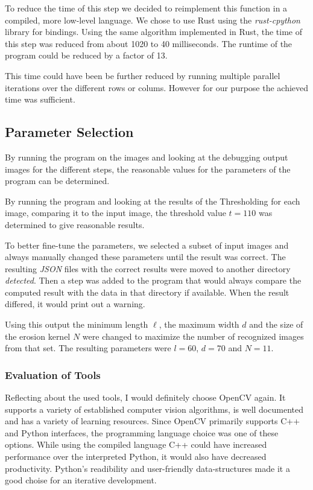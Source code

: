 \documentclass[serif,article,noparskip]{agse-thesis}
\begin{document}
To reduce the time of this step we decided to reimplement this function in a
compiled, more low-level language. We chose to use Rust using the \textit{rust-cpython}
library for bindings. Using the same algorithm implemented in Rust, the time of
this step was reduced from about 1020 to 40 milliseconds. The runtime of the
program could be reduced by a factor of 13.

This time could have been be further reduced by running multiple parallel
iterations over the different rows or colums. However for our purpose the
achieved time was sufficient.


\subsection{Parameter Selection} \label{parameter}

By running the program on the images and looking at the debugging output images
for the different steps, the reasonable values for the parameters of the program
can be determined.

By running the program and looking at the results of the Thresholding for each
image, comparing it to the input image, the threshold value $t = 110$ was
determined to give reasonable results.

To better fine-tune the parameters, we selected a subset of input images and
always manually changed these parameters until the result was correct. The
resulting \textit{JSON} files with the correct results were moved to another
directory \textit{detected}. Then a step was added to the program that would
always compare the computed result with the data in that directory if available.
When the result differed, it would print out a warning.

Using this output the minimum length $\ell$, the maximum width $d$ and the size of
the erosion kernel $N$ were changed to maximize the number of recognized images
from that set. The resulting parameters were $l = 60$, $d = 70$ and $N =11$.

\subsubsection{Evaluation of Tools}

Reflecting about the used tools, I would definitely choose OpenCV again. It
supports a variety of established computer vision algorithms, is well documented
and has a variety of learning resources. Since OpenCV primarily supports C++ and
Python interfaces, the programming language choice was one of these options.
While using the compiled language C++ could have increased performance over the
interpreted Python, it would also have decreased productivity.
Python's readibility and user-friendly data-structures made it a good choise for
an iterative development.
\end{document}
